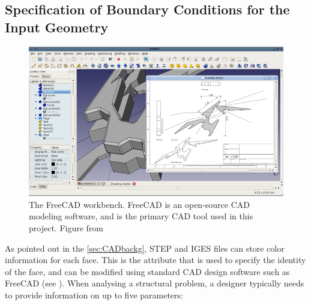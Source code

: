 \subsection{Specification of Boundary Conditions for the Input Geometry}
\label{sec: GeomCreation}

\begin{figure}
\centering
  \includegraphics[scale=0.75]{Pictures/CADToVoxel/FreeCAD.png}
\caption{The FreeCAD workbench. FreeCAD is an open-source CAD modeling software, and is the primary CAD tool used in this project. Figure from \cite{FreeCAD}}
\label{fig: freeCAD}
\end{figure}
As pointed out in the \ref{sec:CADbackg}, STEP and IGES files can store color information for each face. This is the attribute that is used to specify the identity of the face, and can be modified using standard CAD design software such as FreeCAD (see \cite{FreeCAD}). When analysing a structural problem, a designer typically needs to provide information on up to five parameters:


